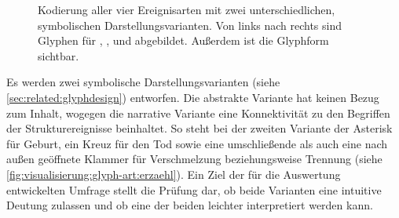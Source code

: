 \begin{figure}
	{\caption{Kodierung aller vier Ereignisarten mit zwei unterschiedlichen, symbolischen Darstellungsvarianten. Von links nach rechts sind Glyphen für , ,  und  abgebildet. Außerdem ist die Glyphform sichtbar.}\label{fig:visualisierung:glyph-art}}
\end{figure}

Es werden zwei symbolische Darstellungsvarianten (siehe \autoref{sec:related:glyphdesign}) entworfen. Die abstrakte Variante hat keinen Bezug zum Inhalt, wogegen die narrative Variante eine Konnektivität zu den Begriffen der Strukturereignisse beinhaltet. So steht bei der zweiten Variante der Asterisk für Geburt, ein Kreuz für den Tod sowie eine umschließende als auch eine nach außen geöffnete Klammer für Verschmelzung beziehungsweise Trennung (siehe \autoref{fig:visualisierung:glyph-art:erzaehl}). Ein Ziel der für die Auswertung entwickelten Umfrage stellt die Prüfung dar, ob beide Varianten eine intuitive Deutung zulassen und ob eine der beiden leichter interpretiert werden kann. %

